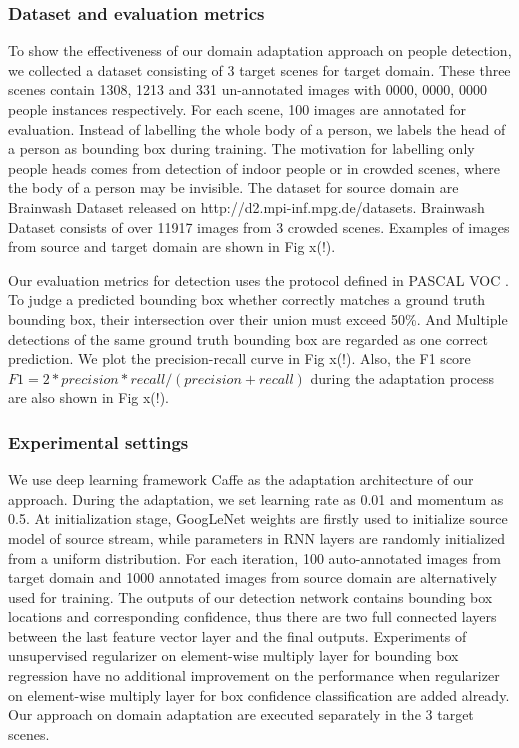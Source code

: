 \documentclass[runningheads]{llncs}
\begin{document}
\subsubsection{Dataset and evaluation metrics}
To show the effectiveness of our domain adaptation approach on people detection, we collected a dataset consisting of 3 target scenes for target domain. These three scenes contain 1308, 1213 and 331 un-annotated images with 0000, 0000, 0000 people instances respectively. For each scene, 100 images are annotated for evaluation. Instead of labelling the whole body of a person, we labels the head of a person as bounding box during training. The motivation for labelling only people heads comes from detection of indoor people or in crowded scenes, where the body of a person may be invisible. The dataset for source domain are Brainwash Dataset released on http://d2.mpi-inf.mpg.de/datasets. Brainwash Dataset consists of over 11917 images from 3 crowded scenes. Examples of images from source and target domain are shown in Fig x(!).

Our evaluation metrics for detection uses the protocol defined in PASCAL VOC \cite{everingham2015pascal}. To judge a predicted bounding box whether correctly matches a ground truth bounding box, their intersection over their union must exceed 50\%. And Multiple detections of the same ground truth bounding box are regarded as one correct prediction. We plot the precision-recall curve in Fig x(!). Also, the F1 score $F1 = 2*precision*recall/(precision+recall)$ during the adaptation process are also shown in Fig x(!).



\subsubsection{Experimental settings}
We use deep learning framework Caffe \cite{jia2014caffe} as the adaptation architecture of our approach. During the adaptation, we set learning rate as 0.01 and momentum as 0.5. At initialization stage, GoogLeNet weights are firstly used to initialize source model of source stream, while parameters in RNN layers are randomly initialized from a uniform distribution. For each iteration, 100 auto-annotated images from target domain and 1000 annotated images from source domain are alternatively used for training. The outputs of our detection network contains bounding box locations and corresponding confidence, thus there are two full connected layers between the last feature vector layer and the final outputs. Experiments of unsupervised regularizer on element-wise multiply layer for bounding box regression have no additional improvement on the performance when regularizer on element-wise multiply layer for box confidence classification are added already. Our approach on domain adaptation are executed separately in the 3 target scenes.
\end{document}
